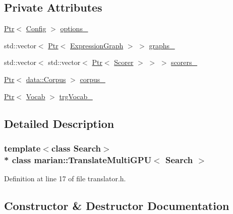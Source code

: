\subsection*{Private Attributes}
\begin{DoxyCompactItemize}
\item 
\hyperlink{namespacemarian_ad1a373be43a00ef9ce35666145137b08}{Ptr}$<$ \hyperlink{classmarian_1_1Config}{Config} $>$ \hyperlink{classmarian_1_1TranslateMultiGPU_aee684bc13d5c8a9f84c1a1a18a73a147}{options\+\_\+}
\item 
std\+::vector$<$ \hyperlink{namespacemarian_ad1a373be43a00ef9ce35666145137b08}{Ptr}$<$ \hyperlink{classmarian_1_1ExpressionGraph}{Expression\+Graph} $>$ $>$ \hyperlink{classmarian_1_1TranslateMultiGPU_ab4ffb4c6d4e65d3cc564f0b290f0bc72}{graphs\+\_\+}
\item 
std\+::vector$<$ std\+::vector$<$ \hyperlink{namespacemarian_ad1a373be43a00ef9ce35666145137b08}{Ptr}$<$ \hyperlink{classmarian_1_1Scorer}{Scorer} $>$ $>$ $>$ \hyperlink{classmarian_1_1TranslateMultiGPU_a783f8e4ecfcba37a2dc516fc685a403d}{scorers\+\_\+}
\item 
\hyperlink{namespacemarian_ad1a373be43a00ef9ce35666145137b08}{Ptr}$<$ \hyperlink{classmarian_1_1data_1_1Corpus}{data\+::\+Corpus} $>$ \hyperlink{classmarian_1_1TranslateMultiGPU_a7fce5f63667fe7a8dbdf94d1146aa2f8}{corpus\+\_\+}
\item 
\hyperlink{namespacemarian_ad1a373be43a00ef9ce35666145137b08}{Ptr}$<$ \hyperlink{classmarian_1_1Vocab}{Vocab} $>$ \hyperlink{classmarian_1_1TranslateMultiGPU_a7a87528adeb1af7db2bdd9880634cd24}{trg\+Vocab\+\_\+}
\end{DoxyCompactItemize}


\subsection{Detailed Description}
\subsubsection*{template$<$class Search$>$\\*
class marian\+::\+Translate\+Multi\+G\+P\+U$<$ Search $>$}



Definition at line 17 of file translator.\+h.



\subsection{Constructor \& Destructor Documentation}
